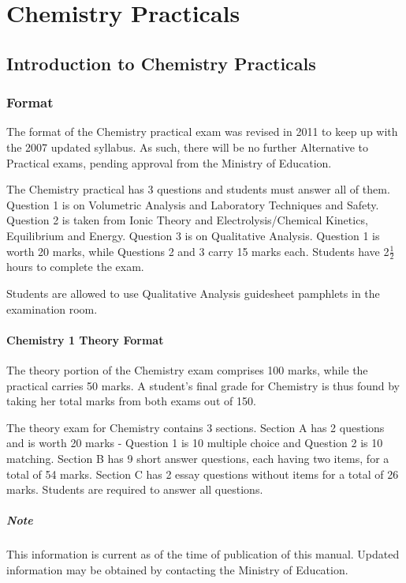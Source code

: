 \chapter{Chemistry Practicals}

\section{Introduction to Chemistry Practicals}

\subsection{Format}
The format of the Chemistry practical exam was revised in 2011 to keep up with the 2007 updated syllabus. As such, there will be no further Alternative to Practical exams, pending approval from the Ministry of Education.

The Chemistry practical has 3 questions and students must answer all of them. Question 1 is on Volumetric Analysis and Laboratory Techniques and Safety. Question 2 is taken from Ionic Theory and Electrolysis\slash Chemical Kinetics, Equilibrium and Energy. Question 3 is on Qualitative Analysis. Question 1 is worth 20 marks, while Questions 2 and 3 carry 15 marks each. Students have 2$\frac{1}{2}$ hours to complete the exam.

Students are allowed to use Qualitative Analysis guidesheet pamphlets in the examination room.

\subsubsection{Chemistry 1 Theory Format}
The theory portion of the Chemistry exam comprises 100 marks, while the practical carries 50 marks. A student's final grade for Chemistry is thus found by taking her total marks from both exams out of 150.

The theory exam for Chemistry contains 3 sections. Section A has 2 questions and is worth 20 marks - Question 1 is 10 multiple choice and Question 2 is 10 matching. Section B has 9 short answer questions, each having two items, for a total of 54 marks. Section C has 2 essay questions without items for a total of 26 marks. Students are required to answer all questions.

\paragraph{Note} This information is current as of the time of publication of this manual. Updated information may be obtained by contacting the Ministry of Education.

